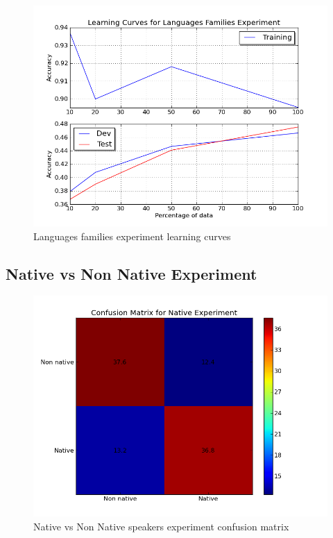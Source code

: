 \documentclass[11pt]{article}
\begin{document}
\begin{figure}[htp]
\centering
\includegraphics[scale=0.45]{family_lc.png}
\caption{Languages families experiment learning curves}
\label{fam_lc}
\end{figure}

\subsection{Native vs Non Native Experiment}



\begin{figure}[htp]
\centering
\includegraphics[scale=0.45]{native_cfm.png}
\caption{Native vs Non Native speakers experiment confusion matrix}
\label{non_cfm}
\end{figure}
\end{document}
